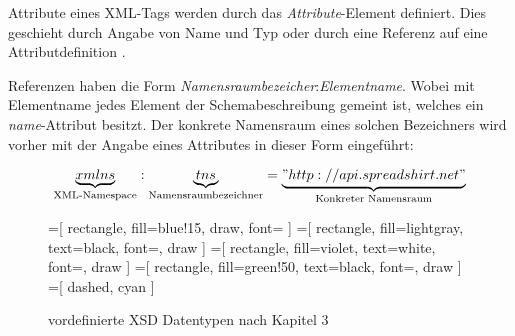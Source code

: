 Attribute eines XML-Tags werden durch das \emph{Attribute}-Element definiert. Dies geschieht durch Angabe von Name und Typ  oder durch eine Referenz auf eine Attributdefinition .

Referenzen haben die Form \emph{Namensraumbezeicher}:\emph{Elementname}. Wobei mit Elementname jedes Element der Schemabeschreibung gemeint ist, welches ein \emph{name}-Attribut besitzt. Der konkrete Namensraum eines solchen Bezeichners wird vorher mit der Angabe eines Attributes in dieser Form eingeführt:

\[  
    \underbrace{xmlns}_{\tiny \text{XML-Namespace}}:\underbrace{tns}_{\tiny \text{Namensraumbezeichner}}=\underbrace{"http://api.spreadshirt.net"}_{\tiny \text{Konkreter Namensraum}}
\]


%
%

\newpage

\begin{figure}[!t]
    \centering
    =[
        rectangle,
        fill={blue!15},
        draw,
        font=\sffamily
    ]      
    =[
        rectangle,
        fill=lightgray,
        text=black,
        font=\sffamily,
        draw
    ]
    =[
        rectangle,
        fill=violet,
        text=white,
        font=\sffamily,
        draw
    ]
    =[
        rectangle,
        fill=green!50,
        text=black,
        font=\sffamily,
        draw
    ]
    =[
        dashed,
        cyan
    ]
    \resizebox{!}{0.92\textheight} {
        \begin{minipage}[b]{0.45\linewidth}
        \end{minipage}
        \hspace{12pt}
        \begin{minipage}[b]{0.45\linewidth}
        \end{minipage}
    }
    \caption{vordefinierte XSD Datentypen nach \cite{XMLSchema11Specification} Kapitel 3}
    \label{fig:xsddatatypes}
\end{figure}